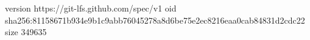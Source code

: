version https://git-lfs.github.com/spec/v1
oid sha256:81158671b934e9b1c9abb76045278a8d6be75e2ec8216eaa0cab84831d2cdc22
size 349635
